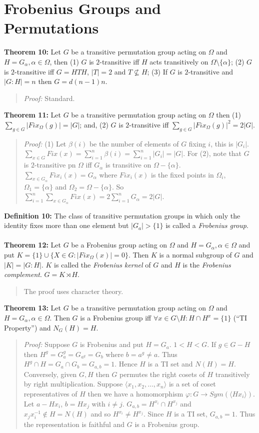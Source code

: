 \section{Frobenius Groups and Permutations}
{\bf Theorem 10:}
Let $G$ be a transitive permutation group acting on $\Omega$ and $H= G_{\alpha}, \alpha \in \Omega$,
then (1) $G$ is $2$-transitive iff $H$ acts transitively on $\Omega \setminus \{ \alpha \}$;
(2) $G$ is $2$-transitive iff $G= HTH$, $|T|= 2$ and $T \nsubseteq H$;
(3) If $G$ is $2$-transitive and $|G:H|= n$ then $G= d(n-1)n$.
\begin{quote}
\emph{Proof:}  
Standard.
\end{quote}
{\bf Theorem 11:}
Let $G$ be a transitive permutation group acting on $\Omega$ then 
(1) $\sum_{g \in G} |Fix_{\Omega}(g)| = |G|$; and,
(2) $G$ is $2$-transitive iff $\sum_{g \in G} |Fix_{\Omega}(g)|^2 = 2|G|$.
\begin{quote}
\emph{Proof:}  
(1) Let $\beta(i)$ be the number of elements of $G$ fixing $i$, this is $|G_i|$.
$\sum_{x \in G} Fix(x) = \sum_{i=1}^n \beta(i)= \sum_{i=1}^n |G_i|= |G|$.  
For (2), note that $G$ is $2$-transitive pn $\Omega$ iff $G_{\alpha}$ is transitive on
$\Omega- \{ \alpha \}$.
$\sum_{x \in G_{\alpha}} Fix_i(x) = G_{\alpha}$ where $Fix_i(x)$ is the fixed points in
$\Omega_i$,
$\Omega_1= \{ \alpha \}$ and
$\Omega_2= \Omega -\{ \alpha \}$.  So
$\sum_{i=1}^n \sum_{x \in G_{\alpha}} Fix(x) = 2 \sum_{i=1}^n G_{\alpha} =2|G|$.
\end{quote}
{\bf Definition 10:} The class of transitive permutation groups in which only the identity fixes
more than one element but $|G_a| > \{ 1 \}$ is called a \emph{Frobenius group}.
\\
\\
{\bf Theorem 12:}
Let $G$ be a Frobenius group acting on $\Omega$ and $H= G_{\alpha}, \alpha \in \Omega$ and
put $K= \{ 1 \} \cup \{X \in G: |Fix_{\Omega}(x)|= 0 \}$.  Then $K$ is a normal subgroup
of $G$ and $|K|= |G:H|$.  $K$ is called the \emph{Frobenius kernel} of $G$ and $H$ is the
\emph{Frobenius complement}.  $G= K \rtimes H$.
\begin{quote}
The proof uses character theory.
\end{quote}
{\bf Theorem 13:}
Let $G$ be a transitive permutation group acting on $\Omega$ and $H= G_{\alpha}, \alpha \in \Omega$.
Then $G$ is a Frobenius group iff $\forall x \in G \setminus H: H \cap H^x = \{ 1 \}$ 
(``TI Property'') and $N_G(H)= H$.
\begin{quote}
\emph{Proof:}  
Suppose $G$ is Frobenius and put $H=G_a$. $1 < H < G$.   If $g \in G-H$ then
$H^g= G_a^g= G_{a^g}= G_b$ where $b= a^g \ne a$.   Thus $H^g \cap H = G_a \cap G_b= G_{a,b}=1$.
Hence $H$ is a TI set and $N(H)=H$.  Conversely,
given $G, H$ then $G$ permutes the right cosets of $H$ transitively by right multiplication.
Suppose $\langle x_1, x_2, \ldots , x_n \rangle$ is a set of coset representatives of $H$ then
we have a homomorphism $\varphi: G \rightarrow Sym(\langle Hx_i \rangle)$.  Let
$a- H x_i$, $b= Hx_j$ with $i \ne j$.  $G_{a,b}= H^{x_i} \cap H^{x_j}$ and
$x_j x_i^{-1} \notin H=N(H)$ and so $H^{x_i} \ne H^{x_j}$.   Since $H$ is a TI set,
$G_{a,b} = 1$.  Thus the representation is faithful and $G$ is a Frobenius group.
\end{quote}
